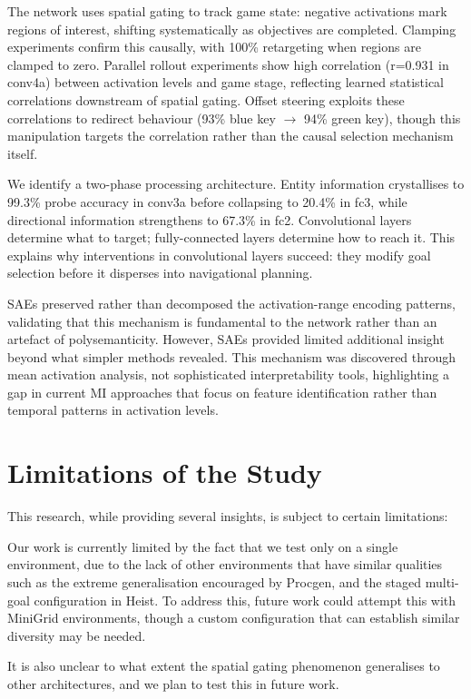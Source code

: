The network uses spatial gating to track game state: negative activations mark regions of interest, shifting systematically as objectives are completed. Clamping experiments confirm this causally, with 100\% retargeting when regions are clamped to zero. Parallel rollout experiments show high correlation (r=0.931 in conv4a) between activation levels and game stage, reflecting learned statistical correlations downstream of spatial gating. Offset steering exploits these correlations to redirect behaviour (93\% blue key $\rightarrow$ 94\% green key), though this manipulation targets the correlation rather than the causal selection mechanism itself.

We identify a two-phase processing architecture. Entity information crystallises to 99.3\% probe accuracy in conv3a before collapsing to 20.4\% in fc3, while directional information strengthens to 67.3\% in fc2. Convolutional layers determine what to target; fully-connected layers determine how to reach it. This explains why interventions in convolutional layers succeed: they modify goal selection before it disperses into navigational planning.

SAEs preserved rather than decomposed the activation-range encoding patterns, validating that this mechanism is fundamental to the network rather than an artefact of polysemanticity. However, SAEs provided limited additional insight beyond what simpler methods revealed. This mechanism was discovered through mean activation analysis, not sophisticated interpretability tools, highlighting a gap in current MI approaches that focus on feature identification rather than temporal patterns in activation levels.

\section{Limitations of the Study}\label{sec:limitations}

This research, while providing several insights, is subject to certain limitations:

Our work is currently limited by the fact that we test only on a single environment, due to the lack of other environments that have similar qualities such as the extreme generalisation encouraged by Procgen, and the staged multi-goal configuration in Heist. To address this, future work could attempt this with MiniGrid environments, though a custom configuration that can establish similar diversity may be needed.

It is also unclear to what extent the spatial gating phenomenon generalises to other architectures, and we plan to test this in future work.

